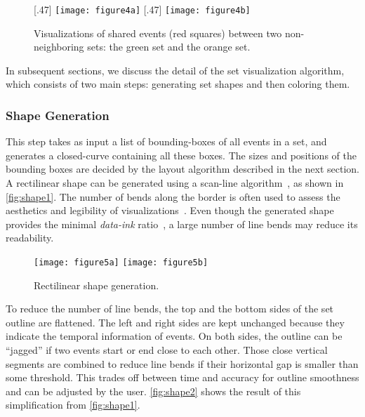 \begin{figure}[!htb]
	\centering
	[.47\columnwidth]
	{\texttt{[image: figure4a]}}
	\hfill
	[.47\columnwidth]
	{\texttt{[image: figure4b]}}
	\caption{Visualizations of shared events (red squares) between two non-neighboring sets: the green set and the orange set.}
	\label{fig:layering-compare}
\end{figure}

In subsequent sections, we discuss the detail of the set visualization algorithm, which consists of two main steps: generating set shapes and then coloring them.

\subsubsection{Shape Generation}
\label{sub:shapesgeneration}
This step takes as input a list of bounding-boxes of all events in a set, and generates a closed-curve containing all these boxes. The sizes and positions of the bounding boxes are decided by the layout algorithm described in the next section. A rectilinear shape can be generated using a scan-line algorithm~\cite{Foley1997}, as shown in \autoref{fig:shape1}. The number of bends along the border is often used to assess the aesthetics and legibility of visualizations~\cite{Tanahashi2012}. Even though the generated shape provides the minimal \textit{data-ink} ratio~\cite{Tufte1983}, a large number of line bends may reduce its readability.

\begin{figure}[!htb]
	\centering
	{\texttt{[image: figure5a]}}
	\hfill
	{\texttt{[image: figure5b]}}
	\caption{Rectilinear shape generation.}
	\label{fig:shape}
\end{figure}

To reduce the number of line bends, the top and the bottom sides of the set outline are flattened. The left and right sides  are kept unchanged because they indicate the temporal information of events. On both sides, the outline can be ``jagged'' if two events start or end close to each other. Those close vertical segments are combined to reduce line bends if their horizontal gap is smaller than some threshold. This trades off between time and accuracy for outline smoothness and can be adjusted by the user. \autoref{fig:shape2} shows the result of this simplification from \autoref{fig:shape1}.

